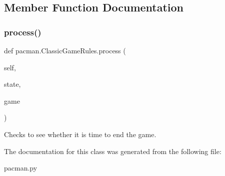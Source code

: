 \subsection{Member Function Documentation}
\mbox{\label{classpacman_1_1_classic_game_rules_aa61bf270cf8e333d1aa805106afb08f9}} 
\subsubsection{\texorpdfstring{process()}{process()}}
{\footnotesize\ttfamily def pacman.\+Classic\+Game\+Rules.\+process (\begin{DoxyParamCaption}\item[{}]{self,  }\item[{}]{state,  }\item[{}]{game }\end{DoxyParamCaption})}

\begin{DoxyVerb}Checks to see whether it is time to end the game.
\end{DoxyVerb}
 

The documentation for this class was generated from the following file\+:\begin{DoxyCompactItemize}
\item 
pacman.\+py\end{DoxyCompactItemize}
